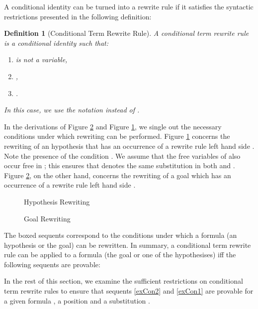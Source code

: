 \documentclass[copyright]{eptcs}
\newtheorem{definition}[theorem]{Definition}
\begin{document}
A conditional identity can be turned into a rewrite rule if it satisfies the syntactic restrictions presented in the following definition:

\begin{definition}[Conditional Term Rewrite Rule]
A conditional term rewrite rule is a conditional identity  such that:
\begin{enumerate}
\item  is not a variable,
\item ,
\item .
\end{enumerate}
In this case, we use the notation  instead of .
\end{definition}

In the derivations of Figure \ref{gRewDeriv} and Figure \ref{hRewDeriv}, we single out the necessary conditions under which rewriting can be performed. Figure \ref{hRewDeriv} concerns the rewriting of an hypothesis that has an occurrence of a rewrite rule left hand side . Note the presence of the condition . We assume that the free variables of  also occur free in ; this ensures that  denotes the same substitution in both  and . Figure \ref{gRewDeriv}, on the other hand, concerns the rewriting of a goal which has an occurrence of a rewrite rule left hand side .
\begin{figure}[h]
\centering
\fbox{
\begin{footnotesize}

\end{footnotesize}
}
\caption{Hypothesis Rewriting}
\label{hRewDeriv}
\end{figure}

\begin{figure}[h]
\centering
\fbox{
\begin{footnotesize}

\end{footnotesize}
}
\caption{Goal Rewriting}
\label{gRewDeriv}
\end{figure}

The boxed sequents correspond to the conditions under which a formula (an hypothesis or the goal) can be rewritten. In summary, a conditional term rewrite rule  can be applied to a formula  (the goal or one of the hypothesises) iff the following sequents are provable:


In the rest of this section, we examine the sufficient restrictions on conditional term rewrite rules to ensure that sequents \ref{exCon2} and \ref{exCon1} are provable for a given formula , a position  and a substitution .
\end{document}
